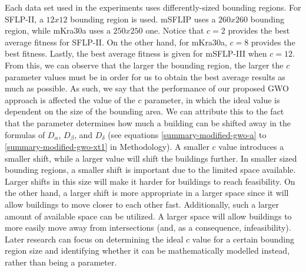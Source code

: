 Each data set used in the experiments uses differently-sized bounding regions. For SFLP-II, a $12x12$ bounding region is used. mSFLIP uses a $260x260$ bounding region, while mKra30a uses a $250x250$ one. Notice that $c = 2$ provides the best average fitness for SFLP-II. On the other hand, for mKra30a, $c = 8$ provides the best fitness. Lastly, the best average fitness is given for mSFLP-III when $c = 12$. From this, we can observe that the larger the bounding region, the larger the $c$ parameter values must be in order for us to obtain the best average results as much as possible. As such, we say that the performance of our proposed GWO approach is affected the value of the $c$ parameter, in which the ideal value is dependent on the size of the bounding area. We can attribute this to the fact that the parameter determines how much a building can be shifted away in the formulas of $D_{\alpha}$, $D_{\beta}$, and $D_{\delta}$ (see equations \ref{summary-modified-gwo-a} to \ref{summary-modified-gwo-xt1} in Methodology). A smaller $c$ value introduces a smaller shift, while a larger value will shift the buildings further. In smaller sized bounding regions, a smaller shift is important due to the limited space available. Larger shifts in this size will make it harder for buildings to reach feasibility. On the other hand, a larger shift is more appropriate in a larger space since it will allow buildings to move closer to each other fast. Additionally, such a larger amount of available space can be utilized. A larger space will allow buildings to more easily move away from intersections (and, as a consequence, infeasibility). Later research can focus on determining the ideal $c$ value for a certain bounding region size and identifying whether it can be mathematically modelled instead, rather than being a parameter.

